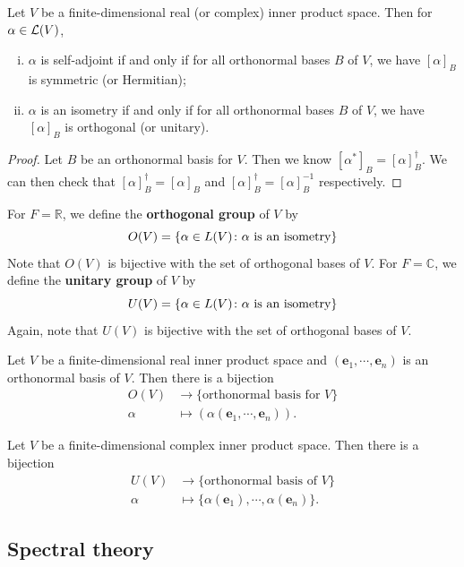\documentclass[a4paper,11pt]{article}
\begin{document}
\begin{lemma}
	Let \( V \) be a finite-dimensional real (or complex) inner product space.
	Then for \( \alpha \in {\mathcal{L}}(V) \),
	\begin{enumerate}[(i)]
		\item \( \alpha \) is self-adjoint if and only if for all orthonormal bases \( B \) of \( V \), we have \( [\alpha]_B \) is symmetric (or Hermitian);
		\item \( \alpha \) is an isometry if and only if for all orthonormal bases \( B \) of \( V \), we have \( [\alpha]_B \) is orthogonal (or unitary).
	\end{enumerate}
\end{lemma}
\begin{proof}
	Let \( B \) be an orthonormal basis for \( V \).
	Then we know \( [\alpha^*]_B = [\alpha]_B^\dagger \).
	We can then check that \( [\alpha]_B^\dagger = [\alpha]_B \) and \( [\alpha]_B^\dagger = [\alpha]_B^{-1} \) respectively.
\end{proof}
\begin{definition}
	For \( F = \mathbb R \), we define the \textbf{orthogonal group} of \( V \) by
	\[
		O(V) = \qty{ \alpha \in L(V) \colon \alpha \text{ is an isometry} }
	\]
	Note that \( O(V) \) is bijective with the set of orthogonal bases of \( V \).
	For \( F = \mathbb C \), we define the \textbf{unitary group} of \( V \) by
	\[
		U(V) = \qty{ \alpha \in L(V) \colon \alpha \text{ is an isometry} }
	\]
	Again, note that \( U(V) \) is bijective with the set of orthogonal bases of \( V \).
\end{definition}

Let $V$ be a finite-dimensional real inner product space and $(\mathbf{e}_1, \cdots, \mathbf{e}_n)$ is an orthonormal basis of $V$. Then there is a bijection
\begin{align*}
O(V) &\to \{\text{orthonormal basis for }V\}\\
\alpha &\mapsto (\alpha(\mathbf{e}_1, \cdots, \mathbf{e}_n)).
\end{align*}

Let $V$ be a finite-dimensional complex inner product space. Then there is a bijection
\begin{align*}
U(V) &\to \{\text{orthonormal basis of } V\}\\
\alpha &\mapsto \{\alpha(\mathbf{e}_1), \cdots, \alpha (\mathbf{e}_n)\}.
\end{align*}

\subsection{Spectral theory}
\end{document}
